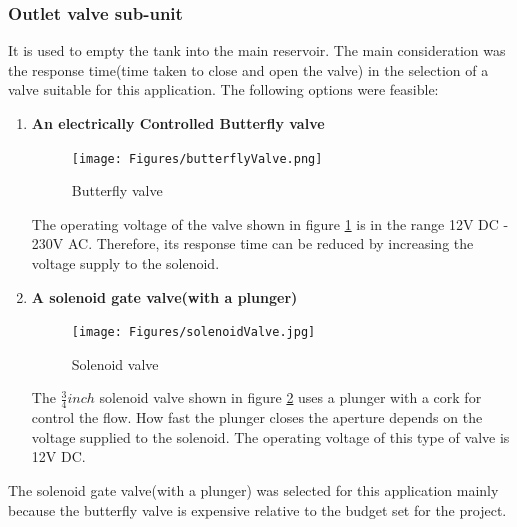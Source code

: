 \subsubsection{Outlet valve sub-unit}
It is used to empty the tank into the main reservoir. The main consideration was the response time(time taken to close and open the valve) in the selection of a valve suitable for this application. The following options were feasible:
\begin{enumerate}
    \item \textbf{An electrically Controlled Butterfly valve}
    \par
    \begin{figure}[H]
        \centering
        \texttt{[image: Figures/butterflyValve.png]}
        \caption[Butterfly valve]{Butterfly valve \cite{butterfly}}
        \label{fig:butterfly_valve}
    \end{figure}
    The operating voltage of the valve shown in figure \ref{fig:butterfly_valve} is in the range 12V DC - 230V AC. Therefore, its response time can be reduced by increasing the voltage supply to the solenoid.
    \item \textbf{A solenoid gate valve(with a plunger)}
    \par
    \begin{figure}[H]
        \centering
        \texttt{[image: Figures/solenoidValve.jpg]}
        \caption[Solenoid valve]{Solenoid valve \cite{solenoid}}
        \label{fig:solenoid_valve}
    \end{figure}
    The $\frac{3}{4} inch$ solenoid valve shown in figure \ref{fig:solenoid_valve} uses a plunger with a cork for control the flow. How fast the plunger closes the aperture depends on the voltage supplied to the solenoid. The operating voltage of this type of valve is 12V DC.
\end{enumerate}

The solenoid gate valve(with a plunger) was selected for this application mainly because the butterfly valve is expensive relative to the budget set for the project.

